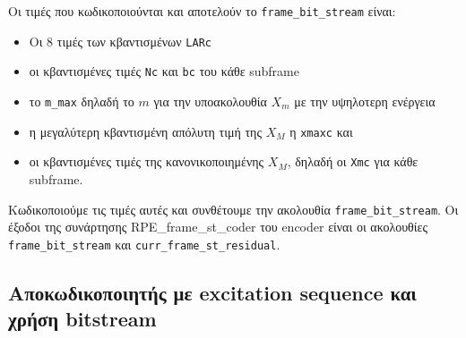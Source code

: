 \documentclass{article}
\begin{document}
Οι τιμές που κωδικοποιούνται και αποτελούν το \verb|frame_bit_stream| είναι:

\begin{itemize}
    \item Οι 8 τιμές των κβαντισμένων \verb|LARc|
    \item οι κβαντισμένες τιμές \verb|Nc| και \verb|bc| του κάθε subframe 
    \item το \verb|m_max| δηλαδή το $m$ για την υποακολουθία $X_m$ με την υψηλοτερη ενέργεια
    \item η μεγαλύτερη κβαντισμένη απόλυτη τιμή της $Χ_M$ η \verb|xmaxc| και 
    \item οι κβαντισμένες τιμές της κανονικοποιημένης $X_M$, δηλαδή οι \verb|Xmc| για κάθε subframe.  
\end{itemize}

Κωδικοποιούμε τις τιμές αυτές και συνθέτουμε την ακολουθία 
\verb|frame_bit_stream|. Οι έξοδοι της συνάρτησης RPE\_frame\_st\_coder του encoder είναι οι ακολουθίες
\verb|frame_bit_stream| και \verb|curr_frame_st_residual|.

 \subsection{Αποκωδικοποιητής με excitation sequence και χρήση bitstream}
\end{document}
